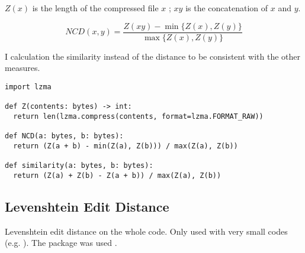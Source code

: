 \documentclass[../main.tex]{subfiles}
\begin{document}
$Z(x)$ is the length of the compressed file $x$ ; $xy$ is the concatenation of $x$ and $y$.

\begin{equation}
  NCD(x,y) = \dfrac{Z(xy) - \min \{Z(x),Z(y)\}}{\max \{Z(x),Z(y)\}}
\end{equation}

I calculation the similarity instead of the distance to be consistent with the other measures.

\begin{lstlisting}[style=pymd]
import lzma

def Z(contents: bytes) -> int:
  return len(lzma.compress(contents, format=lzma.FORMAT_RAW))

def NCD(a: bytes, b: bytes):
  return (Z(a + b) - min(Z(a), Z(b))) / max(Z(a), Z(b))

def similarity(a: bytes, b: bytes):
  return (Z(a) + Z(b) - Z(a + b)) / max(Z(a), Z(b))
\end{lstlisting}

\subsection{Levenshtein Edit Distance}
Levenshtein edit distance on the whole code. Only used with very small codes (e.g. ).
The  package  was used \cite{pyLev}.
\end{document}
